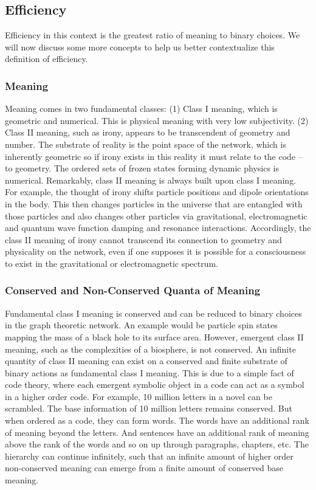 \documentclass[submission,copyright,creativecommons]{eptcs}
\begin{document}
\subsection{Efficiency}

Efficiency in this context is the greatest ratio of meaning to binary choices. We will now discuss some more concepts to help us better contextualize this definition of efficiency.

\subsubsection{Meaning}

Meaning comes in two fundamental classes: (1) Class I meaning, which is geometric and numerical. This is physical meaning with very low subjectivity. (2) Class II meaning, such as irony, appears to be transcendent of geometry and number. The substrate of reality is the point space of the network, which is inherently geometric so if irony exists in this reality it must relate to the code -- to geometry. The ordered sets of frozen states forming dynamic physics is numerical. Remarkably, class II meaning is always built upon class I meaning. For example, the thought of irony shifts particle positions and dipole orientations in the body. This then changes particles in the universe that are entangled with those particles and also changes other particles via gravitational, electromagnetic and quantum wave function damping and resonance interactions. Accordingly, the class II meaning of irony cannot transcend its connection to geometry and physicality on the network, even if one supposes it is possible for a consciousness to exist in the gravitational or electromagnetic spectrum.

\subsubsection{Conserved and Non-Conserved Quanta of Meaning}

Fundamental class I meaning is conserved and can be reduced to binary choices in the graph theoretic network. An example would be particle spin states mapping the mass of a black hole to its surface area. However, emergent class II meaning, such as the complexities of a biosphere, is not conserved. An infinite quantity of class II meaning can exist on a conserved and finite substrate of binary actions as fundamental class I meaning. This is due to a simple fact of code theory, where each emergent symbolic object in a code can act as a symbol in a higher order code. For example, 10 million letters in a novel can be scrambled. The base information of 10 million letters remains conserved. But when ordered as a code, they can form words. The words have an additional rank of meaning beyond the letters. And sentences have an additional rank of meaning above the rank of the words and so on up through paragraphs, chapters, etc. The hierarchy can continue infinitely, such that an infinite amount of higher order non-conserved meaning can emerge from a finite amount of conserved base meaning.
\end{document}
